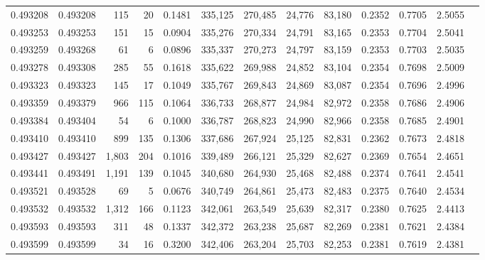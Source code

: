 \begin{tabular}{rrrrrrrrrrrrr}
0.493208 & 0.493208 &   115 &    20 &                                     0.1481 & 335,125 & 270,485 &  24,776 &  83,180 & 0.2352 & 0.7705 & 2.5055 \\
0.493253 & 0.493253 &   151 &    15 &                                     0.0904 & 335,276 & 270,334 &  24,791 &  83,165 & 0.2353 & 0.7704 & 2.5041 \\
0.493259 & 0.493268 &    61 &     6 &                                     0.0896 & 335,337 & 270,273 &  24,797 &  83,159 & 0.2353 & 0.7703 & 2.5035 \\
0.493278 & 0.493308 &   285 &    55 &                                     0.1618 & 335,622 & 269,988 &  24,852 &  83,104 & 0.2354 & 0.7698 & 2.5009 \\
0.493323 & 0.493323 &   145 &    17 &                                     0.1049 & 335,767 & 269,843 &  24,869 &  83,087 & 0.2354 & 0.7696 & 2.4996 \\
0.493359 & 0.493379 &   966 &   115 &                                     0.1064 & 336,733 & 268,877 &  24,984 &  82,972 & 0.2358 & 0.7686 & 2.4906 \\
0.493384 & 0.493404 &    54 &     6 &                                     0.1000 & 336,787 & 268,823 &  24,990 &  82,966 & 0.2358 & 0.7685 & 2.4901 \\
0.493410 & 0.493410 &   899 &   135 &                                     0.1306 & 337,686 & 267,924 &  25,125 &  82,831 & 0.2362 & 0.7673 & 2.4818 \\
0.493427 & 0.493427 & 1,803 &   204 &                                     0.1016 & 339,489 & 266,121 &  25,329 &  82,627 & 0.2369 & 0.7654 & 2.4651 \\
0.493441 & 0.493491 & 1,191 &   139 &                                     0.1045 & 340,680 & 264,930 &  25,468 &  82,488 & 0.2374 & 0.7641 & 2.4541 \\
0.493521 & 0.493528 &    69 &     5 &                                     0.0676 & 340,749 & 264,861 &  25,473 &  82,483 & 0.2375 & 0.7640 & 2.4534 \\
0.493532 & 0.493532 & 1,312 &   166 &                                     0.1123 & 342,061 & 263,549 &  25,639 &  82,317 & 0.2380 & 0.7625 & 2.4413 \\
0.493593 & 0.493593 &   311 &    48 &                                     0.1337 & 342,372 & 263,238 &  25,687 &  82,269 & 0.2381 & 0.7621 & 2.4384 \\
0.493599 & 0.493599 &    34 &    16 &                                     0.3200 & 342,406 & 263,204 &  25,703 &  82,253 & 0.2381 & 0.7619 & 2.4381 \\

\end{tabular}
